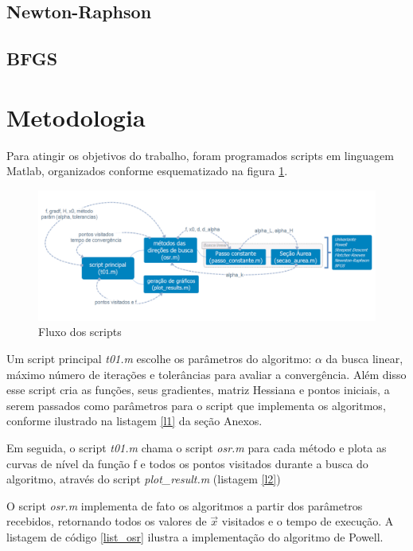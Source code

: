 \documentclass[10pt, a4paper]{article}
\begin{document}
\subsection{Newton-Raphson}


\subsection{BFGS}

\section{Metodologia}

Para atingir os objetivos do trabalho, foram programados scripts em linguagem Matlab, organizados conforme esquematizado na figura \ref{fig:fluxo}.

\begin{figure}[H]
      \centering
      \includegraphics[width=.9\textwidth]{t01.png}
      \caption{Fluxo dos scripts}
      \label{fig:fluxo}
\end{figure}

Um script principal \textit{t01.m} escolhe os par\^ametros do algoritmo: $\alpha$ da busca linear, m\'aximo n\'umero de itera\c c\~oes e toler\^ancias para avaliar a converg\^encia. Al\'em disso esse script cria as fun\c c\~oes, seus gradientes, matriz Hessiana e pontos iniciais, a serem passados como par\^ametros para o script que implementa os algoritmos, conforme ilustrado na listagem \ref{l1} da se\c c\~ao Anexos.

Em seguida, o script \textit{t01.m} chama o script \textit{osr.m} para cada m\'etodo e plota as curvas de n\'ivel da fun\c c\~ao f e todos os pontos visitados durante a busca do algoritmo, atrav\'es do script \textit{plot\_result.m} (listagem \ref{l2})

O script \textit{osr.m} implementa de fato os algoritmos a partir dos par\^ametros recebidos, retornando todos os valores de $\vec{x}$ visitados e o tempo de execu\c c\~ao. A listagem de c\'odigo \ref{list_osr} ilustra a implementa\c c\~ao do algoritmo de Powell.
\end{document}
